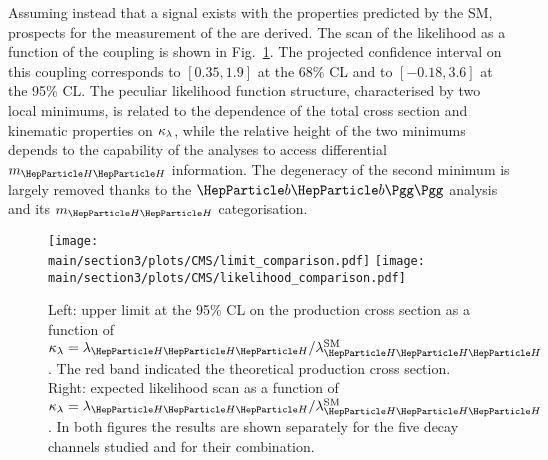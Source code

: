 Assuming instead that a \HH signal exists with the properties predicted by the SM, prospects for the measurement of the \lambdahhh are derived.
The scan of the likelihood as a function of the \kapl coupling is shown in Fig.~\ref{sec3:CMSHH:fig:comb_plots}.
The projected confidence interval on this coupling corresponds to $[0.35, 1.9]$ at the 68\% CL and to $[-0.18, 3.6]$ at the 95\% CL.
The peculiar likelihood function structure, characterised by two local minimums, is related to the dependence of the total cross section and \HH kinematic properties on $\kappa_\lambda$, while the relative height of the two minimums depends to the capability of the analyses to access differential $m_{\HH}$ information.
The degeneracy of the second minimum is largely removed thanks to the $\bbgg$ analysis and its $m_{\HH}$ categorisation.



\begin{figure}[htb]
  \centering
   \texttt{[image: \\main/section3/plots/CMS/limit\_comparison.pdf]}
    \texttt{[image: \\main/section3/plots/CMS/likelihood\_comparison.pdf]}
    \caption{Left: upper limit at the 95\% CL on the \HH production cross section as a function of $\kapl = \lambdahhh/\lambdahhh^\text{SM}$. The red band indicated the theoretical production cross section. Right: expected likelihood scan as a function of $\kappa_\lambda = \lambdahhh/\lambdahhh^\text{SM}$. In both figures the results are shown separately for the five decay channels studied and for their combination.}
    \label{sec3:CMSHH:fig:comb_plots}
\end{figure}
